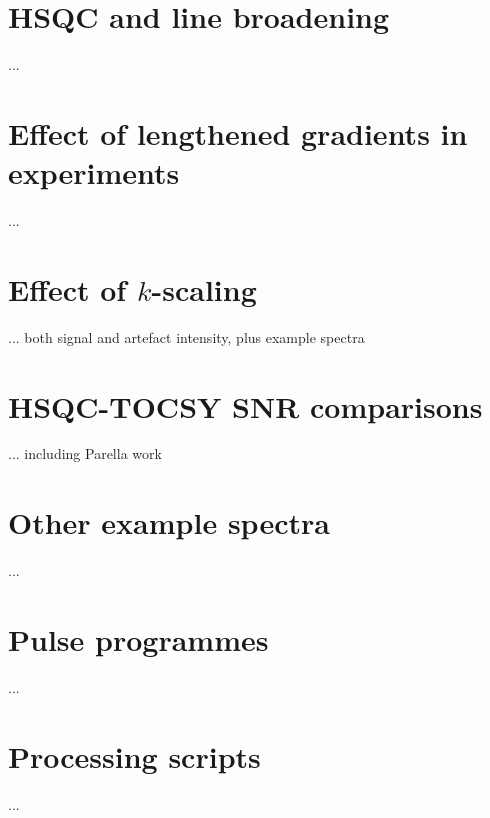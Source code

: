 \section{\texorpdfstring{\nitrogen{}}{15N} HSQC and line broadening}

...

\section{Effect of lengthened gradients in \texorpdfstring{\nitrogen{}}{15N} experiments}

...

\section{Effect of \texorpdfstring{$k$}{k}-scaling}

... both signal and artefact intensity, plus example spectra

\section{HSQC-TOCSY SNR comparisons}

... including Parella work

\section{Other example spectra}

...

\section{Pulse programmes}

...

\section{Processing scripts}

...
